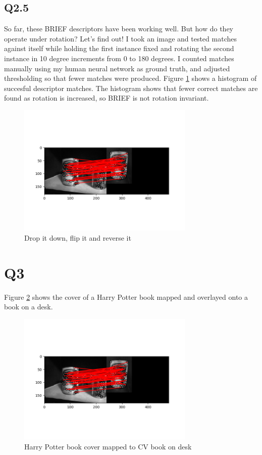 \documentclass[12pt]{article}
\begin{document}
\subsection { Q2.5 }

So far, these BRIEF descriptors have been working well. But how do they operate under rotation? Let's find out! I took an image and tested matches against itself while holding the first instance fixed and rotating the second instance in 10 degree increments from 0 to 180 degrees. I counted matches manually using my human neural network as ground truth, and adjusted thresholding so that fewer matches were produced. Figure \ref{fig:rotbad} shows a histogram of succesful descriptor matches. The histogram shows that fewer correct matches are found as rotation is increased, so BRIEF is not rotation invariant.

\begin{figure}[H]
\centering
\includegraphics[page=1,width=0.75\textwidth]{q2_4}
\caption{ Drop it down, flip it and reverse it }
\label{fig:rotbad}
\end{figure}   


\section { Q3 }
Figure \ref{fig:lumos} shows the cover of a Harry Potter book mapped and overlayed onto a book on a desk.
\begin{figure}[H]
\centering
\includegraphics[page=1,width=0.75\textwidth]{q2_4}
\caption{ Harry Potter book cover mapped to CV book on desk }
\label{fig:lumos}
\end{figure}   
\end{document}
